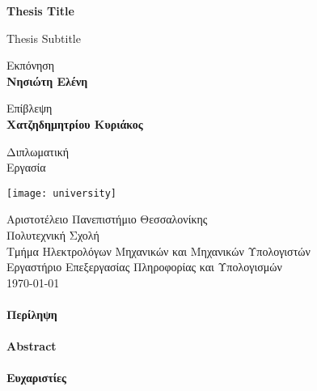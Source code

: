 \begin{titlepage}
	\begin{center}
		\vspace*{1cm}
		
		\Huge
		\textbf{Thesis Title}
		
		\vspace{0.5cm}
		\LARGE
		Thesis Subtitle
		
		\vspace{1.5cm}
		
		Εκπόνηση \\
		\textbf{Νησιώτη Ελένη}
		
		\vspace{1.5cm}
		
		Επίβλεψη \\
		\textbf{Χατζηδημητρίου Κυριάκος}
		
		\vfill
		
		Διπλωματική\\
		Εργασία		
		\vspace{0.8cm}
		
		\texttt{[image: university]}
		
		\Large
		Αριστοτέλειο Πανεπιστήμιο Θεσσαλονίκης\\
		Πολυτεχνική Σχολή\\
		Τμήμα Ηλεκτρολόγων Μηχανικών και Μηχανικών Υπολογιστών\\
		Εργαστήριο Επεξεργασίας Πληροφορίας και Υπολογισμών\\		
		\today
		
	\end{center}
\end{titlepage}

{
	\titleformat{\paragraph}[display]{\normalfont\Large\bfseries\centering}{\theparagraph}{1em}{}
	\paragraph{Περίληψη}
	\newpage
	\paragraph{Abstract}
	\newpage
	\paragraph{Ευχαριστίες}
	\newpage
}


\tableofcontents
\listoffigures
\listoftables

